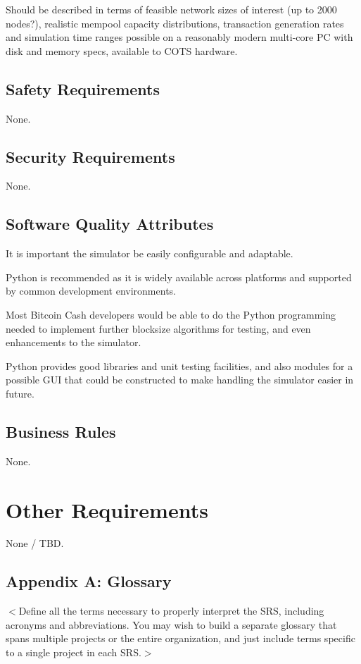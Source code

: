 \documentclass{scrreprt}
\begin{document}
Should be described in terms of feasible network sizes of interest (up to 2000 nodes?),
realistic mempool capacity distributions, transaction generation rates and simulation
time ranges possible on a reasonably modern multi-core PC with disk and memory specs,
available to COTS hardware.


\section{Safety Requirements}
None.

\section{Security Requirements}
None.

\section{Software Quality Attributes}
It is important the simulator be easily configurable and adaptable.

Python is recommended as it is widely available across platforms and supported
by common development environments.

Most Bitcoin Cash developers would be able to do the Python programming needed
to implement further blocksize algorithms for testing, and even enhancements
to the simulator.

Python provides good libraries and unit testing facilities, and also modules
for a possible GUI that could be constructed to make handling the simulator
easier in future.


\section{Business Rules}
None.


\chapter{Other Requirements}
None / TBD.

\section{Appendix A: Glossary}
$<$Define all the terms necessary to properly interpret the SRS, including
acronyms and abbreviations. You may wish to build a separate glossary that spans
multiple projects or the entire organization, and just include terms specific to
a single project in each SRS.$>$
\end{document}
